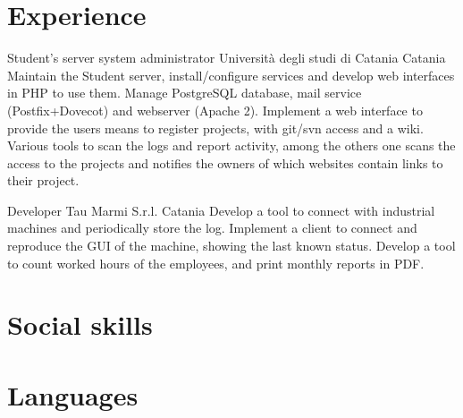 \documentclass[11pt,a4paper,sans]{moderncv} %
\begin{document}
\section{Experience}

    {Student's server system administrator}
    {Universit\`{a} degli studi di Catania}
    {Catania}
    {}
    {Maintain the Student server, install/configure services and develop web interfaces in PHP to use them.
    \newline
    Manage PostgreSQL database, mail service (Postfix+Dovecot) and webserver (Apache 2).
    \newline
    Implement a web interface to provide the users means to register projects, with git/svn access and a wiki.
    \newline
    Various tools to scan the logs and report activity, among the others one scans the access to the projects and notifies the owners of which websites contain links to their project.}


    {Developer}
    {Tau Marmi S.r.l.}
    {Catania}
    {}
    {Develop a tool to connect with industrial machines and periodically store the log. Implement a client to connect and reproduce the GUI of the machine, showing the last known status.
    \newline
    Develop a tool to count worked hours of the employees, and print monthly reports in PDF.}


\section{Social skills}




\section{Languages}
\end{document}
